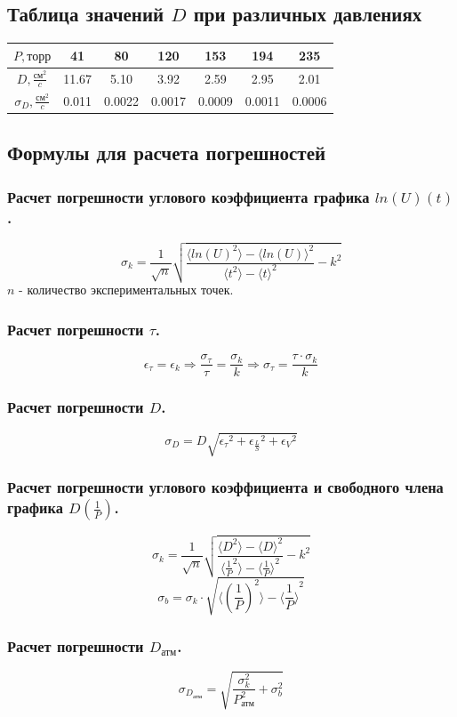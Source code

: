 \subsection{Таблица значений $D$ при различных давлениях}
\begin{tabular}{|c|c|c|c|c|c|c|}
    \hline
    $P, \text{торр}$   & 41 & 80 & 120 & 153 & 194 & 235 \\ \hline
    $D, \frac{\text{см}^2}{c}$ & 11.67 & 5.10 & 3.92 & 2.59 & 2.95 & 2.01 \\ \hline
    $\sigma_D, \frac{\text{см}^2}{c}$ & 0.011 & 0.0022 & 0.0017 & 0.0009 & 0.0011 & 0.0006 \\ \hline
\end{tabular}
\subsection{Формулы для расчета погрешностей}
\subsubsection{Расчет погрешности углового коэффициента графика $ln(U)(t)$.}
\[\sigma_k = \frac{1}{\sqrt{n}}\sqrt{\frac{\langle ln(U)^2 \rangle - {\langle ln(U) \rangle}^2}{\langle t^2 \rangle - {\langle t \rangle}^2} - k^2}\] $n$ - количество экспериментальных точек.
\subsubsection{Расчет погрешности $\tau$.}
\[\epsilon_\tau = \epsilon_k \Rightarrow \frac{\sigma_\tau}{\tau} = \frac{\sigma_k}{k} \Rightarrow \sigma_\tau = \frac{\tau \cdot \sigma_k}{k}\]
\subsubsection{Расчет погрешности $D$.}
\[ \sigma_D = D\sqrt{{\epsilon_\tau}^2 + {\epsilon_{\frac{L}{S}}}^2 + {\epsilon_V}^2}\]
\subsubsection{Расчет погрешности углового коэффициента и свободного члена графика $D(\frac{1}{P})$.}
\[\sigma_k = \frac{1}{\sqrt{n}}\sqrt{\frac{\langle D^2 \rangle - {\langle D \rangle}^2}{\langle \frac{1}{P}^2 \rangle - {\langle \frac{1}{P} \rangle}^2} - k^2}\]
\[\sigma_b = \sigma_k \cdot \sqrt{\langle (\frac{1}{P})^2 \rangle - {\langle \frac{1}{P} \rangle}^2}\]
\subsubsection{Расчет погрешности $D_\text{атм}$.}
\[ \sigma_{D_\text{атм}} =\sqrt{\frac{\sigma_k^2}{P_\text{атм}^2} + \sigma_b^2}\]